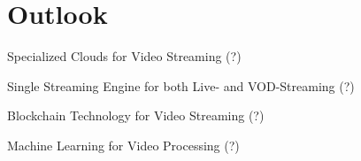 
\chapter{Outlook}\label{chapter:outlook}

Specialized Clouds for Video Streaming (?)

Single Streaming Engine for both Live- and VOD-Streaming (?)

Blockchain Technology for Video Streaming (?)

Machine Learning for Video Processing (?)